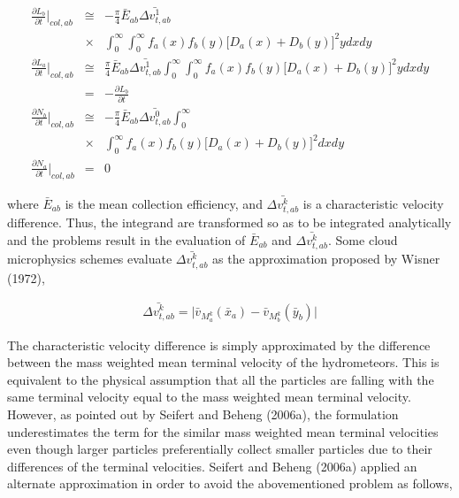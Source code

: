 \begin{eqnarray}
\frac{\partial L_{b}}{\partial t}\Bigr|_{col,ab}&\cong&-\frac{\pi}{4}\bar{E}_{ab}\bar{\Delta v_{t,ab}^{1}}\nonumber\\
&\times&\int_{0}^{\infty}\int_{0}^{\infty}f_{a}(x)f_{b}(y)\bigl[D_{a}(x)+D_{b}(y)\bigr]^{2}ydxdy\label{sn161}\\
\frac{\partial L_{a}}{\partial t}\Bigr|_{col,ab}&\cong&\frac{\pi}{4}\bar{E}_{ab}\bar{\Delta v_{t,ab}^{1}}\int_{0}^{\infty}\int_{0}^{\infty}f_{a}(x)f_{b}(y)\bigl[D_{a}(x)+D_{b}(y)\bigr]^{2}ydxdy\nonumber\\
&=&-\frac{\partial L_{b}}{\partial t}\label{sn162}\\
\frac{\partial N_{b}}{\partial t}\Bigr|_{col,ab}&\cong&-\frac{\pi}{4}\bar{E}_{ab}\bar{\Delta v_{t,ab}^{0}}\int_{0}^{\infty}\nonumber\\
&\times&\int_{0}^{\infty}f_{a}(x)f_{b}(y)\bigl[D_{a}(x)+D_{b}(y)\bigr]^{2}dxdy\label{sn163}\\
\frac{\partial N_{a}}{\partial t}\Bigr|_{col,ab}&=&0\label{sn164}
\end{eqnarray}

where $\bar{E}_{ab}$ is the mean collection efficiency, and $\bar{\Delta v_{t,ab}^{k}}$ is a characteristic velocity difference. Thus, the integrand are transformed so as to be integrated analytically and the problems result in the evaluation of $\bar{E}_{ab}$ and $\bar{\Delta v_{t,ab}^{k}}$. Some cloud microphysics schemes evaluate $\bar{\Delta v_{t,ab}^{k}}$ as the approximation proposed by Wisner (1972),

\begin{eqnarray}
\bar{\Delta v_{t,ab}^{k}}=\bigl|\bar{v}_{M_{a}^{k}}(\bar{x}_{a})-\bar{v}_{M_{b}^{k}}(\bar{y}_{b})\bigr|\label{sn165}
\end{eqnarray}

The characteristic velocity difference is simply approximated by the difference between the mass weighted mean terminal velocity of the hydrometeors. This is equivalent to the physical assumption that all the particles are falling with the same terminal velocity equal to the mass weighted mean terminal velocity. However, as pointed out by Seifert and Beheng (2006a), the formulation underestimates the term for the similar mass weighted mean terminal velocities even though larger particles preferentially collect smaller particles due to their differences of the terminal velocities. Seifert and Beheng (2006a) applied an alternate approximation in order to avoid the abovementioned problem as follows,

